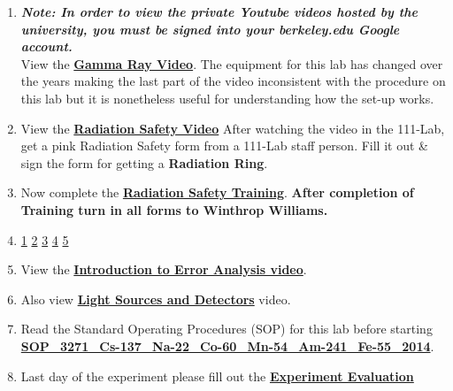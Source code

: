 \documentclass{../lab}
\begin{document}
\begin{enumerate}
    \item \emph{\textbf{Note: In order to view the private Youtube videos hosted by the university, you must be signed into your berkeley.edu Google account.}} \\
    View the \href{http://youtu.be/cZGMngx-6yE}{\textbf{Gamma Ray Video}}. The equipment for this lab has changed over the years making the last part of the video inconsistent with the procedure on this lab but it is nonetheless useful for understanding how the set-up works.

    \item View the \href{http://youtu.be/KHxtzF5pZZM}{\textbf{\textbf{Radiation Safety Video}}} After watching the video in the 111-Lab, get a pink Radiation Safety form from a 111-Lab staff person. Fill it out \& sign the form for getting a \textbf{Radiation Ring}.

    \item Now complete the \href{https://berkeley-physics111b.github.io/safety/radiation/}{\textbf{Radiation Safety Training}}. \textbf{After completion of Training turn in all forms to Winthrop Williams.}

    \item \signatures \hyperlink{Variable High Voltage Supply}{ 1}  \hyperlink{Change of Pulses}{ 2} \hyperlink{Parameters}{ 3} \hyperlink{Back-Scatter and Compton Edge Signals}{ 4} \hyperlink{Intensity Formula}{ 5}

    \item View the \href{http://youtu.be/jR54387Wd6c}{\textbf{Introduction to Error Analysis video}}.

    \item Also view \href{http://youtu.be/lQKLakISoBA}{\textbf{Light Sources and Detectors}} video.

    \item Read the Standard Operating Procedures (SOP) for this lab before starting \href{https://berkeley-physics111b.github.io/assets/pdf/oldwebsitestructure/images/SOP\_3271\_Cs-137\_Na-22\_Co-60\_Mn-54\_Am-241\_Fe-55\_2014.pdf}{\textbf{SOP\_3271\_Cs-137\_Na-22\_Co-60\_Mn-54\_Am-241\_Fe-55\_2014}}.

    \item Last day of the experiment please fill out the \href{\ExperimentEvaluation}{\textbf{Experiment Evaluation}}

\end{enumerate}
\end{document}
